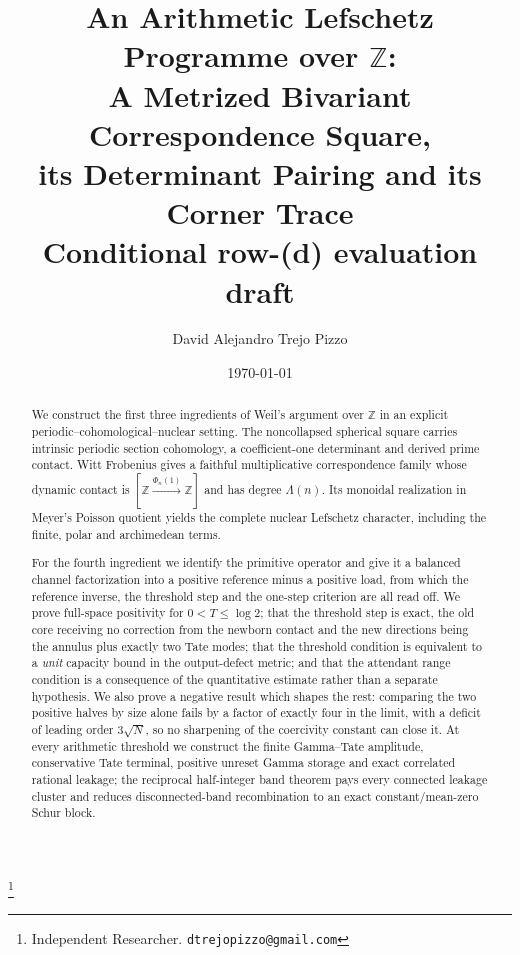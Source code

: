 \documentclass[11pt]{amsart}
\theoremstyle{definition}
\theoremstyle{remark}
\newcommand{\Z}{\mathbb Z}
\begin{document}
\title[An arithmetic Lefschetz programme over $\Z$]
{An Arithmetic Lefschetz Programme over $\Z$:\\
A Metrized Bivariant Correspondence Square,\\
its Determinant Pairing and its Corner Trace\\[4pt]
\large Conditional row-(d) evaluation draft}

\author{David Alejandro Trejo Pizzo}
\thanks{Independent Researcher. \texttt{dtrejopizzo@gmail.com}}

\date{\today}

\begin{abstract}
We construct the first three ingredients of Weil's argument over $\Z$ in an
explicit periodic--cohomological--nuclear setting.  The noncollapsed
spherical square carries intrinsic periodic section cohomology, a
coefficient-one determinant and derived prime contact.  Witt Frobenius gives
a faithful multiplicative correspondence family whose dynamic contact is
$[\Z\xrightarrow{\Phi_n(1)}\Z]$ and has degree $\Lambda(n)$.  Its monoidal
realization in Meyer's Poisson quotient yields the complete nuclear
Lefschetz character, including the finite, polar and archimedean terms.

For the fourth ingredient we identify the primitive operator and give it a
balanced channel factorization into a positive reference minus a positive
load, from which the reference inverse, the threshold step and the one-step
criterion are all read off.  We prove full-space positivity for
$0<T\leq\log2$; that the threshold step is exact, the old core receiving no
correction from the newborn contact and the new directions being the annulus
plus exactly two Tate modes; that the threshold condition is equivalent to a
\emph{unit} capacity bound in the output-defect metric; and that the
attendant range condition is a consequence of the quantitative estimate
rather than a separate hypothesis.  We also prove a negative result which
shapes the rest: comparing the two positive halves by size alone fails by a
factor of exactly four in the limit, with a deficit of leading order
$3\sqrt N$, so no sharpening of the coercivity constant can close it.  At
every arithmetic threshold we construct the finite Gamma--Tate amplitude,
conservative Tate terminal, positive unreset Gamma storage and exact
correlated rational leakage; the reciprocal half-integer band theorem pays
every connected leakage cluster and reduces disconnected-band recombination
to an exact constant/mean-zero Schur block.


\end{abstract}
\end{document}
